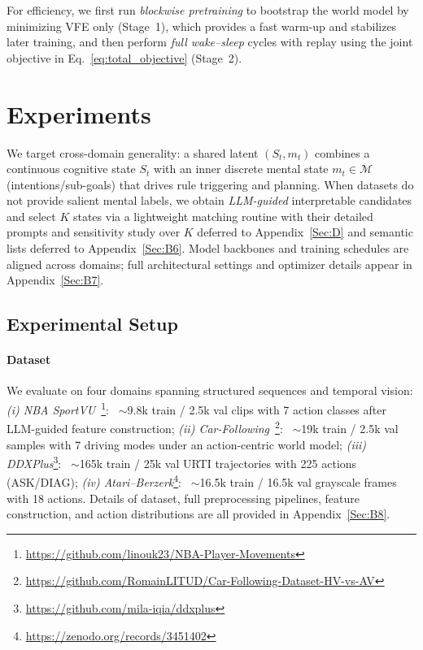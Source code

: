 \documentclass{article} %
\newcommand{\Shuang}[1]{{\color{red}{\sf[Shuang: #1]}}}
\begin{document}
For efficiency, we first run \emph{blockwise pretraining} to bootstrap the world model by minimizing VFE only (Stage~1), which provides a fast warm-up and stabilizes later training, 
and then perform \emph{full wake--sleep} cycles with replay using the joint objective in Eq.~\ref{eq:total_objective} (Stage~2). 


\section{Experiments}
\label{sec:experiments}


We target cross-domain generality: a shared latent $(S_t,m_t)$ combines a continuous cognitive state $S_t$ with an inner discrete mental state $m_t\in\mathcal{M}$ (intentions/sub-goals) that drives rule triggering and planning.
When datasets do not provide salient mental labels, we obtain \emph{LLM-guided} interpretable candidates and select $K$ states via a lightweight matching routine with their detailed prompts and  sensitivity study over $K$ deferred to Appendix~\ref{Sec:D} and  semantic lists deferred to Appendix~\ref{Sec:B6}.
Model backbones and training schedules are aligned across domains; full architectural settings and optimizer details appear in Appendix~\ref{Sec:B7}.

\subsection{Experimental Setup}

\paragraph{Dataset}
We evaluate on four domains spanning structured sequences and temporal vision:
\emph{(i) NBA SportVU}~\citep{kambhamettu2024quantifying}\footnote{\url{https://github.com/linouk23/NBA-Player-Movements}}:
~$\sim$9.8k train / 2.5k val clips with 7 action classes after LLM-guided feature construction;
\emph{(ii) Car-Following}~\citep{li2023large}\footnote{\url{https://github.com/RomainLITUD/Car-Following-Dataset-HV-vs-AV}}:
~$\sim$19k train / 2.5k val samples with 7 driving modes under an action-centric world model;
\emph{(iii) DDXPlus}\footnote{\url{https://github.com/mila-iqia/ddxplus}}:
~$\sim$165k train / 25k val URTI trajectories with 225 actions (ASK/DIAG);
\emph{(iv) Atari--Berzerk}\footnote{\url{https://zenodo.org/records/3451402}}:
~$\sim$16.5k train / 16.5k val grayscale frames with 18 actions.
Details of dataset, full preprocessing pipelines, feature construction, and action distributions are all provided in Appendix~\ref{Sec:B8}.
\end{document}

